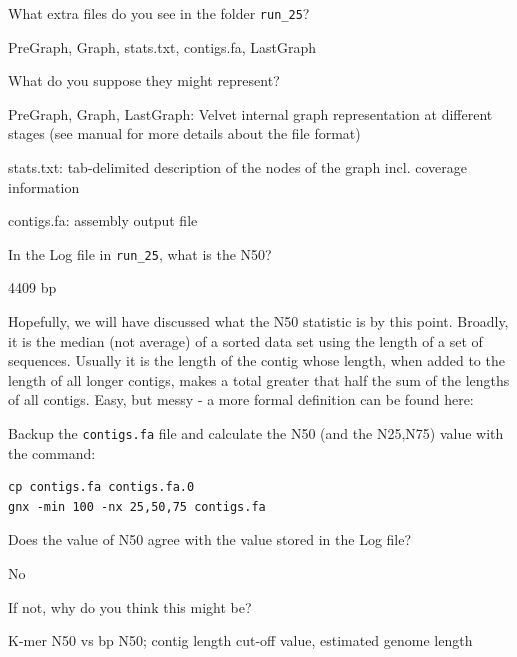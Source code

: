 \begin{questions}
What extra files do you see in the folder \texttt{run\_25}?
\begin{answer}
PreGraph, Graph, stats.txt, contigs.fa, LastGraph
\end{answer}

What do you suppose they might represent?
\begin{answer}
PreGraph, Graph, LastGraph: Velvet internal graph representation at different
stages (see manual for more details about the file format)

stats.txt: tab-delimited description of the nodes of the graph incl. coverage information

contigs.fa: assembly output file
\end{answer}
  
In the Log file in \texttt{run\_25}, what is the N50?
\begin{answer}
4409 bp
\end{answer}
\end{questions}

\begin{information}
Hopefully, we will have discussed what the N50 statistic is by this point.
Broadly, it is the median (not average) of a sorted data set using the length of
a set of sequences. Usually it is the length of the contig whose length, when
added to the length of all longer contigs, makes a total greater that half the
sum of the lengths of all contigs. Easy, but messy - a more formal definition
can be found here:

\end{information}

\begin{steps}
Backup the \texttt{contigs.fa} file and calculate the N50 (and the N25,N75) value with
the command:
\begin{lstlisting}
cp contigs.fa contigs.fa.0
gnx -min 100 -nx 25,50,75 contigs.fa
\end{lstlisting}

\end{steps}

\begin{questions}
Does the value of N50 agree with the value stored in the Log file?
\begin{answer}
No
\end{answer}

If not, why do you think this might be?
\begin{answer}
K-mer N50 vs bp N50; contig length cut-off value, estimated genome length
\end{answer}

\end{questions}

